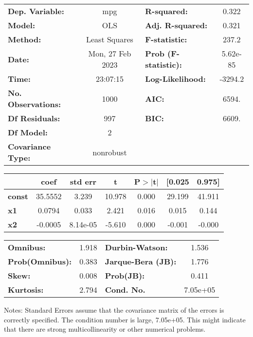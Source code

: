 \begin{center}
\begin{tabular}{lclc}
\toprule
\textbf{Dep. Variable:}    &       mpg        & \textbf{  R-squared:         } &     0.322   \\
\textbf{Model:}            &       OLS        & \textbf{  Adj. R-squared:    } &     0.321   \\
\textbf{Method:}           &  Least Squares   & \textbf{  F-statistic:       } &     237.2   \\
\textbf{Date:}             & Mon, 27 Feb 2023 & \textbf{  Prob (F-statistic):} &  5.62e-85   \\
\textbf{Time:}             &     23:07:15     & \textbf{  Log-Likelihood:    } &   -3294.2   \\
\textbf{No. Observations:} &        1000      & \textbf{  AIC:               } &     6594.   \\
\textbf{Df Residuals:}     &         997      & \textbf{  BIC:               } &     6609.   \\
\textbf{Df Model:}         &           2      & \textbf{                     } &             \\
\textbf{Covariance Type:}  &    nonrobust     & \textbf{                     } &             \\
\bottomrule
\end{tabular}
\begin{tabular}{lcccccc}
               & \textbf{coef} & \textbf{std err} & \textbf{t} & \textbf{P$> |$t$|$} & \textbf{[0.025} & \textbf{0.975]}  \\
\midrule
\textbf{const} &      35.5552  &        3.239     &    10.978  &         0.000        &       29.199    &       41.911     \\
\textbf{x1}    &       0.0794  &        0.033     &     2.421  &         0.016        &        0.015    &        0.144     \\
\textbf{x2}    &      -0.0005  &     8.14e-05     &    -5.610  &         0.000        &       -0.001    &       -0.000     \\
\bottomrule
\end{tabular}
\begin{tabular}{lclc}
\textbf{Omnibus:}       &  1.918 & \textbf{  Durbin-Watson:     } &    1.536  \\
\textbf{Prob(Omnibus):} &  0.383 & \textbf{  Jarque-Bera (JB):  } &    1.776  \\
\textbf{Skew:}          &  0.008 & \textbf{  Prob(JB):          } &    0.411  \\
\textbf{Kurtosis:}      &  2.794 & \textbf{  Cond. No.          } & 7.05e+05  \\
\bottomrule
\end{tabular}
\end{center}

Notes: \newline
 [1] Standard Errors assume that the covariance matrix of the errors is correctly specified. \newline
 [2] The condition number is large, 7.05e+05. This might indicate that there are \newline
 strong multicollinearity or other numerical problems.
